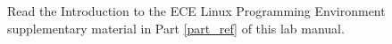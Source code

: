 Read the Introduction to the ECE Linux Programming Environment supplementary material in Part \ref{part_ref} of this lab manual.
%
